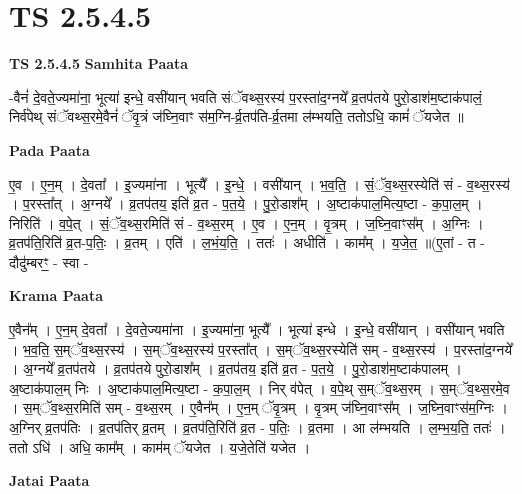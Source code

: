 \documentclass[17pt]{extarticle}
\begin{document}
\section{ TS 2.5.4.5 }

\textbf{TS 2.5.4.5 } \newline
\textbf{Samhita Paata} \newline

-वैनं॑ दे॒वते॒ज्यमा॑ना॒ भूत्या॑ इन्धे॒ वसी॑यान् भवति संॅवथ्स॒रस्य॑ प॒रस्ता॑द॒ग्नये᳚ व्र॒तप॑तये पुरो॒डाश॑म॒ष्टाक॑पालं॒ निर्व॑पेथ् संॅवथ्स॒रमे॒वैनं॑ ॅवृ॒त्रं ज॑घ्नि॒वाꣳ स॑म॒ग्नि-र्व्र॒तप॑ति-र्व्र॒तमा ल॑म्भयति॒ ततोऽधि॒ कामं॑ ॅयजेत ॥ \newline

\textbf{Pada Paata} \newline

ए॒व । ए॒न॒म् । दे॒वता᳚ । इ॒ज्यमा॑ना । भूत्यै᳚ । इ॒न्धे॒ । वसी॑यान् । भ॒व॒ति॒ । सं॒ॅव॒थ्स॒रस्येति॑ सं - व॒थ्स॒रस्य॑ । प॒रस्ता᳚त् । अ॒ग्नये᳚ । व्र॒तप॑तय॒ इति॑ व्र॒त - प॒त॒ये॒ । पु॒रो॒डाश᳚म् । अ॒ष्टाक॑पाल॒मित्य॒ष्टा - क॒पा॒ल॒म् । निरिति॑ । व॒पे॒त् । सं॒ॅव॒थ्स॒रमिति॑ सं - व॒थ्स॒रम् । ए॒व । ए॒न॒म् । वृ॒त्रम् । ज॒घ्नि॒वाꣳस᳚म् । अ॒ग्निः । व्र॒तप॑ति॒रिति॑ व्र॒त-प॒तिः॒ । व्र॒तम् । एति॑ । ल॒भं॒य॒ति॒ । ततः॑ । अधीति॑ । काम᳚म् । य॒जे॒त॒ ॥(ए॒तां - त - दौदु॑म्बरꣳ॒॒ - स्वा -  \newline


\textbf{Krama Paata} \newline

ए॒वैन᳚म् । ए॒न॒म् दे॒वता᳚ । दे॒वते॒ज्यमा॑ना । इ॒ज्यमा॑ना॒ भूत्यै᳚ । भूत्या॑ इन्धे । इ॒न्धे॒ वसी॑यान् । वसी॑यान् भवति । भ॒व॒ति॒ स॒म्ॅव॒थ्स॒रस्य॑ । स॒म्ॅव॒थ्स॒रस्य॑ प॒रस्ता᳚त् । स॒म्ॅव॒थ्स॒रस्येति॑ सम् - व॒थ्स॒रस्य॑ । प॒रस्ता॑द॒ग्नये᳚ । अ॒ग्नये᳚ व्र॒तप॑तये । व्र॒तप॑तये पुरो॒डाश᳚म् । व्र॒तप॑तय॒ इति॑ व्र॒त - प॒त॒ये॒ । पु॒रो॒डाश॑म॒ष्टाक॑पालम् । अ॒ष्टाक॑पाल॒म् निः । अ॒ष्टाक॑पाल॒मित्य॒ष्टा - क॒पा॒ल॒म् । निर् व॑पेत् । व॒पे॒थ् स॒म्ॅव॒थ्स॒रम् । स॒म्ॅव॒थ्स॒रमे॒व । स॒म्ॅव॒थ्स॒रमिति॑ सम् - व॒थ्स॒रम् । ए॒वैन᳚म् । ए॒न॒म् ॅवृ॒त्रम् । वृ॒त्रम् ज॑घ्नि॒वाꣳस᳚म् । ज॒घ्नि॒वाꣳस॑म॒ग्निः । अ॒ग्निर् व्र॒तप॑तिः । व्र॒तप॑तिर् व्र॒तम् । व्र॒तप॑ति॒रिति॑ व्र॒त - प॒तिः॒ । व्र॒तमा । आ ल॑म्भयति । ल॒म्भ॒य॒ति॒ ततः॑ । ततो ऽधि॑ । अधि॒ काम᳚म् । काम॑म् ॅयजेत । य॒जे॒तेति॑ यजेत । \newline

\textbf{Jatai Paata} \newline
\end{document}
